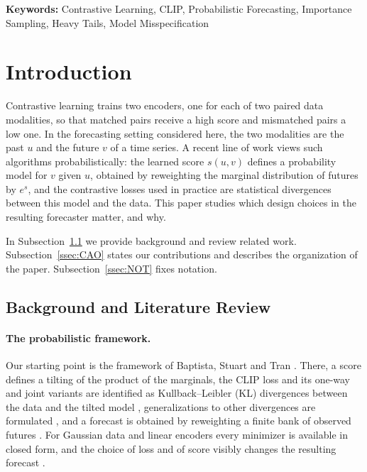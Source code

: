 \documentclass[11pt]{article}
\theoremstyle{plain}
\theoremstyle{definition}
\theoremstyle{remark}
\begin{document}
\noindent\textbf{Keywords:} Contrastive Learning, CLIP, Probabilistic
Forecasting, Importance Sampling, Heavy Tails, Model Misspecification

\section{Introduction}
\label{sec:intro}

Contrastive learning trains two encoders, one for each of two paired data
modalities, so that matched pairs receive a high score and mismatched pairs a
low one. In the forecasting setting considered here, the two modalities are
the past $u$ and the future $v$ of a time series. A recent line of work
\cite{baptista2025mathematical,stuart2026expressivity} views such algorithms
probabilistically: the learned score $s(u,v)$ defines a probability model for
$v$ given $u$, obtained by reweighting the marginal distribution of futures by
$e^{s}$, and the contrastive losses used in practice are statistical
divergences between this model and the data. This paper studies which design
choices in the resulting forecaster matter, and why.

In Subsection~\ref{ssec:BALR} we provide background and review related work.
Subsection~\ref{ssec:CAO} states our contributions and describes the
organization of the paper. Subsection~\ref{ssec:NOT} fixes notation.

\subsection{Background and Literature Review}
\label{ssec:BALR}

\paragraph{The probabilistic framework.}
Our starting point is the framework of Baptista, Stuart and Tran
\cite{baptista2025mathematical}. There, a score defines a tilting of the
product of the marginals, the CLIP loss and its one-way and joint variants are
identified as Kullback--Leibler (KL) divergences between the data and the
tilted model \cite[Thm.~3.2, Thm.~3.8, Rem.~3.12]{baptista2025mathematical},
generalizations to other divergences are formulated
\cite[Opt.~Probs.~3.4 and 3.6, Rem.~3.5]{baptista2025mathematical}, and a
forecast is obtained by reweighting a finite bank of observed futures
\cite[Eq.~(31)]{baptista2025mathematical}. For Gaussian data and linear
encoders every minimizer is available in closed form, and the choice of loss
and of score visibly changes the resulting forecast
\cite[Sec.~5]{baptista2025mathematical}.
\end{document}
